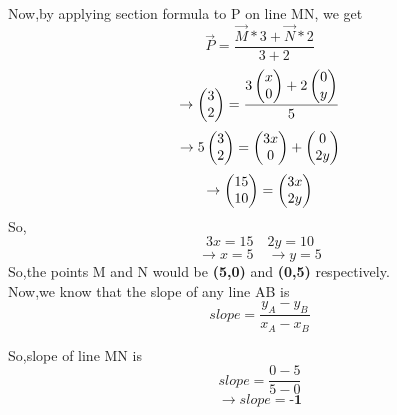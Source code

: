 \documentclass[journal,12pt,threecolumn]{IEEEtran}
\begin{document}
Now,by applying section formula to P on line MN, we get\\
\begin{equation*}
    \vec{P}=\frac{\vec{M}*3+\vec{N}*2}{3+2}
\end{equation*}
\begin{equation*}
    \rightarrow\begin{pmatrix}3 \\ 2\end{pmatrix}=\frac{3\begin{pmatrix}x\\0\end{pmatrix}+2\begin{pmatrix}0\\y\end{pmatrix}}{5}
\end{equation*}
\begin{equation*}
    \rightarrow5\begin{pmatrix}3\\2\end{pmatrix}=\begin{pmatrix}3x\\0\end{pmatrix}+\begin{pmatrix}0\\2y\end{pmatrix}
\end{equation*}
\begin{equation}
\rightarrow\begin{pmatrix}15\\10\end{pmatrix}=\begin{pmatrix}3x\\2y\end{pmatrix}  \nonumber
\end{equation}
So,
\begin{equation*}
3x=15\quad 2y=10
\end{equation*}
\begin{equation}
\rightarrow x=5\quad \rightarrow y=5       \nonumber
\end{equation}
So,the points M and N would be \textbf{(5,0)} and \textbf{(0,5)} respectively.\\

Now,we know that the slope of any line AB is
 \begin{equation}
 slope=\frac{y_A-y_B}{x_A-x_B}          \nonumber
\end{equation}

So,slope of line MN is
 \begin{equation*}
 slope=\frac{0-5}{5-0}
 \end{equation*}
  \begin{equation}
  \rightarrow slope=\textbf{-1}   \nonumber
  \end{equation}
  
\end{document}
